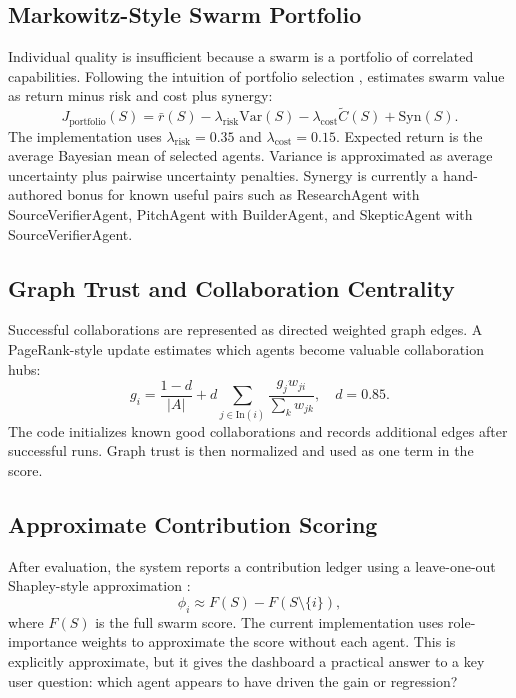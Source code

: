 \subsection{Markowitz-Style Swarm Portfolio}

Individual quality is insufficient because a swarm is a portfolio of correlated capabilities. Following the intuition of portfolio selection \citep{markowitz1952portfolio}, \systemname{} estimates swarm value as return minus risk and cost plus synergy:
\begin{equation}
J_{\mathrm{portfolio}}(S)
=
\bar{r}(S)
-\lambda_{\mathrm{risk}}\mathrm{Var}(S)
-\lambda_{\mathrm{cost}}\tilde{C}(S)
+\mathrm{Syn}(S).
\end{equation}
The implementation uses \(\lambda_{\mathrm{risk}}=0.35\) and \(\lambda_{\mathrm{cost}}=0.15\). Expected return is the average Bayesian mean of selected agents. Variance is approximated as average uncertainty plus pairwise uncertainty penalties. Synergy is currently a hand-authored bonus for known useful pairs such as ResearchAgent with SourceVerifierAgent, PitchAgent with BuilderAgent, and SkepticAgent with SourceVerifierAgent.

\subsection{Graph Trust and Collaboration Centrality}

Successful collaborations are represented as directed weighted graph edges. A PageRank-style update \citep{page1999pagerank} estimates which agents become valuable collaboration hubs:
\begin{equation}
g_i =
\frac{1-d}{|A|}
+ d\sum_{j\in \mathrm{In}(i)}
\frac{g_j w_{ji}}{\sum_k w_{jk}},
\quad d=0.85.
\end{equation}
The code initializes known good collaborations and records additional edges after successful runs. Graph trust is then normalized and used as one term in the \marketmaker{} score.

\subsection{Approximate Contribution Scoring}

After evaluation, the system reports a contribution ledger using a leave-one-out Shapley-style approximation \citep{shapley1953value}:
\begin{equation}
\phi_i \approx F(S) - F(S\setminus\{i\}),
\end{equation}
where \(F(S)\) is the full swarm score. The current implementation uses role-importance weights to approximate the score without each agent. This is explicitly approximate, but it gives the dashboard a practical answer to a key user question: which agent appears to have driven the gain or regression?

